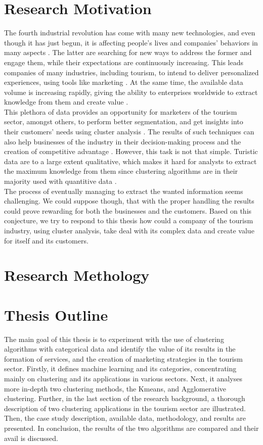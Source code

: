 \section{Research Motivation}
The fourth industrial revolution has come with many new technologies, and even though it has just begun, it is affecting people's lives and companies' behaviors in many aspects \autocite{revolution}. The latter are searching for new ways to address the former and engage them, while their expectations are continuously increasing. This leads companies of many industries, including tourism, to intend to deliver personalized experiences, using tools like marketing \autocite{engagement}. At the same time, the available data volume is increasing rapidly, giving the ability to enterprises worldwide to extract knowledge from them and create value \autocite{bigdata}. \\
This plethora of data provides an opportunity for marketers of the tourism sector, amongst others, to perform better segmentation, and get insights into their customers' needs using cluster analysis \autocite{fuzzyturism}. The results of such techniques can also help businesses of the industry in their decision-making process and the creation of competitive advantage \autocite{advantage}. However, this task is not that simple. Turistic data are to a large extent qualitative, which makes it hard for analysts to extract the maximum knowledge from them since clustering algorithms are in their majority used with quantitive data \autocite{categorical}. \\
The process of eventually managing to extract the wanted information seems challenging. We could suppose though, that with the proper handling the results could prove rewarding for both the businesses and the customers. Based on this conjecture, we try to respond to this thesis how could a company of the tourism industry, using cluster analysis, take deal with its complex data and create value for itself and its customers.
\section{Research Methology}
\section{Thesis Outline}
The main goal of this thesis is to experiment with the use of clustering algorithms with categorical data and identify the value of its results in the formation of services, and the creation of marketing strategies in the tourism sector. Firstly, it defines machine learning and its categories, concentrating mainly on clustering and its applications in various sectors. Next, it analyses more in-depth two clustering methods, the Kmeans, and Agglomerative clustering. Further, in the last section of the research background, a thorough description of two clustering applications in the tourism sector are illustrated. Then, the case study description, available data, methodology, and results are presented. In conclusion, the results of the two algorithms are compared and their avail is discussed.
